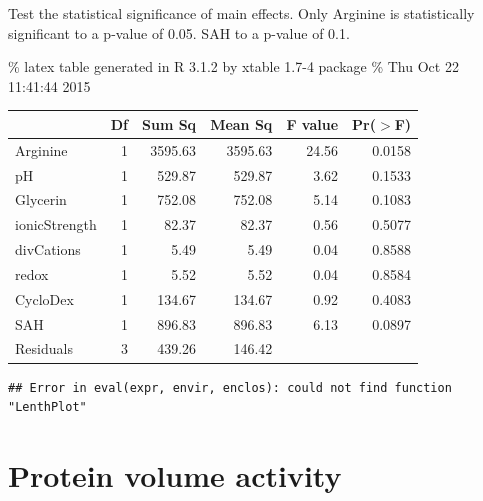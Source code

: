 \documentclass[]{article}
\begin{document}
Test the statistical significance of main effects. Only Arginine is
statistically significant to a p-value of 0.05. SAH to a p-value of 0.1.

\% latex table generated in R 3.1.2 by xtable 1.7-4 package \% Thu Oct
22 11:41:44 2015

\begin{table}[ht]
\centering
\begin{tabular}{lrrrrr}
  \hline
 & Df & Sum Sq & Mean Sq & F value & Pr($>$F) \\ 
  \hline
Arginine      & 1 & 3595.63 & 3595.63 & 24.56 & 0.0158 \\ 
  pH            & 1 & 529.87 & 529.87 & 3.62 & 0.1533 \\ 
  Glycerin      & 1 & 752.08 & 752.08 & 5.14 & 0.1083 \\ 
  ionicStrength & 1 & 82.37 & 82.37 & 0.56 & 0.5077 \\ 
  divCations    & 1 & 5.49 & 5.49 & 0.04 & 0.8588 \\ 
  redox         & 1 & 5.52 & 5.52 & 0.04 & 0.8584 \\ 
  CycloDex      & 1 & 134.67 & 134.67 & 0.92 & 0.4083 \\ 
  SAH           & 1 & 896.83 & 896.83 & 6.13 & 0.0897 \\ 
  Residuals     & 3 & 439.26 & 146.42 &  &  \\ 
   \hline
\end{tabular}
\end{table}

\begin{verbatim}
## Error in eval(expr, envir, enclos): could not find function "LenthPlot"
\end{verbatim}

\section{Protein volume activity}\label{protein-volume-activity}
\end{document}
